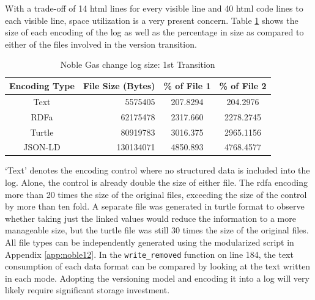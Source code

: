 With a trade-off of 14 \gls{html} lines for every visible line and 40 \gls{html} code lines to each visible line, space utilization is a very present concern.
Table \ref{table:Ng_changelog_table1} shows the size of each encoding of the \gls{log} as well as the percentage in size as compared to either of the files involved in the version transition.
\begin{table}
	\caption{Noble Gas change log size: 1st Transition}
	\label{table:Ng_changelog_table1}
	\centering
	\begin{tabular}{|c|r|c|c|}
		\hline
		Encoding Type & File Size (Bytes) & \% of File 1 & \% of File 2 \\
		\hline
		Text&	5575405&	207.8294&	204.2976\\
		RDFa&	62175478&	2317.660&	2278.2745\\
		Turtle&	80919783&	3016.375&	2965.1156\\
		JSON-LD&	130134071&	4850.893&	4768.4577\\
		\hline
	\end{tabular}
\end{table}
`Text' denotes the encoding control where no structured data is included into the \gls{log}.
Alone, the control is already double the size of either file.
The \gls{rdfa} encoding more than 20 times the size of the original files, exceeding the size of the control by more than ten fold.
A separate file was generated in turtle format to observe whether taking just the \gls{linked} values would reduce the information to a more manageable size, but the turtle file was still 30 times the size of the original files.
All file types can be independently generated using the modularized script in Appendix \ref{app:noble12}.
In the \texttt{write_removed} function on line 184, the text consumption of each data format can be compared by looking at the text written in each mode.
Adopting the versioning model and encoding it into a \gls{log} will very likely require significant storage investment.

